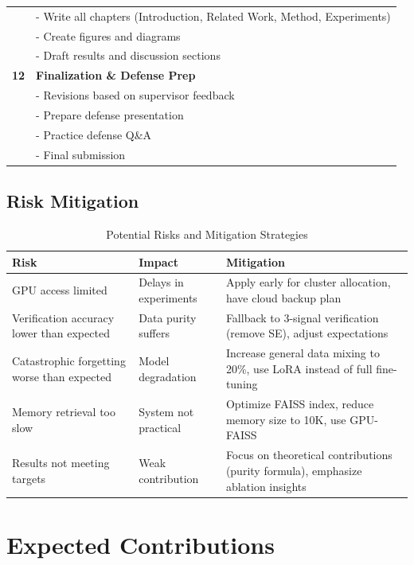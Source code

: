 \documentclass[12pt,a4paper]{article}
\theoremstyle{definition}
\begin{document}
\begin{table}[htbp]
\begin{tabular}{cp{9cm}}
& - Write all chapters (Introduction, Related Work, Method, Experiments) \\
& - Create figures and diagrams \\
& - Draft results and discussion sections \\
\midrule
\textbf{12} & \textbf{Finalization \& Defense Prep} \\
& - Revisions based on supervisor feedback \\
& - Prepare defense presentation \\
& - Practice defense Q\&A \\
& - Final submission \\
\bottomrule
\end{tabular}
\end{table}

\subsection{Risk Mitigation}

\begin{table}[htbp]
\centering
\caption{Potential Risks and Mitigation Strategies}
\small
\begin{tabular}{lp{5cm}p{5cm}}
\toprule
\textbf{Risk} & \textbf{Impact} & \textbf{Mitigation} \\
\midrule
GPU access limited & Delays in experiments & Apply early for cluster allocation, have cloud backup plan \\
\midrule
Verification accuracy lower than expected & Data purity suffers & Fallback to 3-signal verification (remove SE), adjust expectations \\
\midrule
Catastrophic forgetting worse than expected & Model degradation & Increase general data mixing to 20\%, use LoRA instead of full fine-tuning \\
\midrule
Memory retrieval too slow & System not practical & Optimize FAISS index, reduce memory size to 10K, use GPU-FAISS \\
\midrule
Results not meeting targets & Weak contribution & Focus on theoretical contributions (purity formula), emphasize ablation insights \\
\bottomrule
\end{tabular}
\end{table}

\newpage

\section{Expected Contributions}
\end{document}
